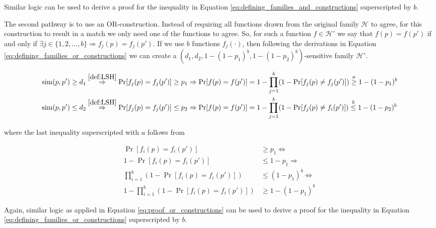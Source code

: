 Similar logic can be used to derive a proof for the inequality in Equation \ref{eq:defining_families_and_constructions} superscripted by $b$. 

The second pathway is to use an OR-construction. Instead of requiring all functions drawn from the original family $\mathcal{H}$ to agree, for this construction to result in a match we only need one of the functions to agree. So, for such a function $f\in\mathcal{H}'$ we say that $f(p)=f(p')$ if and only if $\exists j \in \{1,2,...,b\} \Rightarrow f_j(p)=f_j(p')$.
If we use $b$ functions $f_j(\cdot)$, then following the derivations in Equation \ref{eq:defining_families_or_constructions} we can create a $(d_1,d_2,1 - (1-p_1)^b,1-(1-p_2)^b)$-sensitive family $\mathcal{H}'$.

\begin{equation}
    \begin{aligned}
        &\operatorname{sim}(p, p') \geq d_1 \stackrel{\ref{def:LSH}}{\Rightarrow} \operatorname{Pr}[f_j(p)=f_j(p')] \geq p_1  \Rightarrow \operatorname{Pr}[f(p)=f(p')] = 1 - \prod_{j=1}^{b}( 1 -  \operatorname{Pr}[f_j(p)\neq f_j(p')] ) \stackrel{a}{\geq} 1 -  (1 -  p_1) ^ b \\
        &\operatorname{sim}(p, p') \leq d_2 \stackrel{\ref{def:LSH}}{\Rightarrow} \operatorname{Pr}[f_j(p)=f_j(p')] \leq p_2  \Rightarrow \operatorname{Pr}[f(p)=f(p')] = 1 - \prod_{j=1}^{b}( 1 -  \operatorname{Pr}[f_j(p)\neq f_i(p')] ) \stackrel{b}{\leq} 1 -  (1 -  p_2) ^ b 
        \label{eq:defining_families_or_constructions}
    \end{aligned}
\end{equation}

where the last inequality superscripted with $a$ follows from 

\begin{equation}
    \begin{aligned}
    \operatorname{Pr}[f_i(p)=f_i(p')] &\geq p_1 \Leftrightarrow \\
    1 - \operatorname{Pr}[f_i(p)=f_i(p')] &\leq 1 -  p_1 \Rightarrow \\ 
    \prod_{i=1}^{b}(1 - \operatorname{Pr}[f_i(p)=f_i(p')]) &\leq (1 -  p_1) ^ b \Leftrightarrow \\ 
    1 -  \prod_{i=1}^{b}(1 - \operatorname{Pr}[f_i(p)=f_i(p')]) &\geq 1 -  (1 -  p_1) ^ b  
    \end{aligned}
    \label{eq:proof_or_constructions}
\end{equation}

Again, similar logic as applied in Equation \ref{eq:proof_or_constructions} can be used to derive a proof for the inequality in Equation \ref{eq:defining_families_or_constructions} superscripted by $b$.

